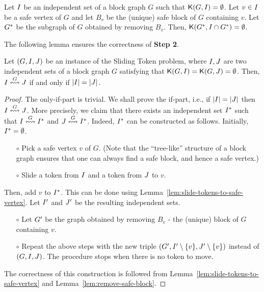 \documentclass[a4paper]{llncs}
\begin{document}
\begin{lemma}
\label{lem:remove-safe-block}
Let $I$ be an independent set of a block graph $G$ such that ${\mathsf K}{(G, I)} = \emptyset$.
Let $v \in I$ be a safe vertex of $G$ and let $B_v$ be the (unique) safe block of $G$ containing $v$.
Let $G^*$ be the subgraph of $G$ obtained by removing $B_v$.
Then, ${\mathsf K}{(G^*, I \cap G^*)} = \emptyset$.
\end{lemma}


The following lemma ensures the correctness of \textbf{Step 2}.


\begin{lemma}
\label{lem:yes-instance-if-same-size}

Let $(G, I, J)$ be an instance of the {\sc Sliding Token} problem, where $I, J$ are two independent sets of a block graph $G$ satisfying that ${\mathsf K}{(G, I)} = {\mathsf K}{(G, J)} = \emptyset$.
Then, $I \overset{G}{\leftrightsquigarrow} J$ if and only if ${\left|I\right|} = {\left|J\right|}$.
\end{lemma}



\begin{proof}

The only-if-part is trivial.
We shall prove the if-part, i.e., if ${\left|I\right|} = {\left|J\right|}$ then $I \overset{G}{\leftrightsquigarrow} J$.
More precisely, we claim that there exists an independent set $I^*$ such that $I \overset{G}{\leftrightsquigarrow} I^*$ and $J \overset{G}{\leftrightsquigarrow} I^*$.
Indeed, $I^*$ can be constructed as follows.
Initially, $I^* = \emptyset$.

\begin{itemize}
\item [$\circ$] Pick a safe vertex $v$ of $G$. (Note that the ``tree-like'' structure of a block graph ensures that one can always find a safe block, and hence a safe vertex.)

\item [$\circ$] Slide a token from $I$ and a token from $J$ to $v$.
\end{itemize}

\noindent
Then, add $v$ to $I^*$.
This can be done using Lemma~\ref{lem:slide-tokens-to-safe-vertex}.
Let $I^{\prime}$ and $J^{\prime}$ be the resulting independent sets.
\begin{itemize}
\item [$\circ$] Let ${G^\prime}$ be the graph obtained by removing $B_v$ - the (unique) block of $G$ containing $v$.

\item [$\circ$] Repeat the above steps with the new triple $({G^\prime}, I^{\prime} \setminus \{v\}, J^{\prime} \setminus \{v\})$ instead of $(G, I, J)$. The procedure stops when there is no token to move.
\end{itemize}

\noindent
The correctness of this construction is followed from Lemma~\ref{lem:slide-tokens-to-safe-vertex} and Lemma~\ref{lem:remove-safe-block}.

\end{proof}
\end{document}
